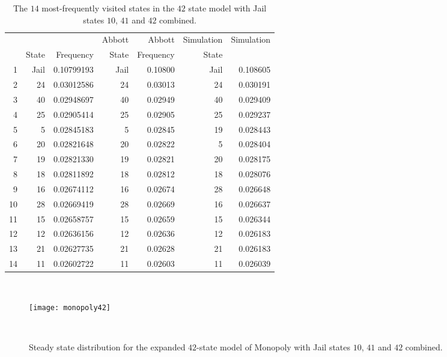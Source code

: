 \documentclass[12pt]{article}
\begin{document}
\begin{table}
    \centering
    \begin{tabular}{rrrrrrr}
           &       &            & Abbott & Abbott    & Simulation & Simulation \\ 
           & State & Frequency  & State  & Frequency & State      &            \\ 
        1  & Jail  & 0.10799193 & Jail   & 0.10800   & Jail       & 0.108605   \\ 
        2  & 24    & 0.03012586 & 24     & 0.03013   & 24         & 0.030191   \\ 
        3  & 40    & 0.02948697 & 40     & 0.02949   & 40         & 0.029409   \\ 
        4  & 25    & 0.02905414 & 25     & 0.02905   & 25         & 0.029237   \\ 
        5  & 5     & 0.02845183 & 5      & 0.02845   & 19         & 0.028443   \\ 
        6  & 20    & 0.02821648 & 20     & 0.02822   & 5          & 0.028404   \\ 
        7  & 19    & 0.02821330 & 19     & 0.02821   & 20         & 0.028175   \\ 
        8  & 18    & 0.02811892 & 18     & 0.02812   & 18         & 0.028076   \\ 
        9  & 16    & 0.02674112 & 16     & 0.02674   & 28         & 0.026648   \\ 
        10 & 28    & 0.02669419 & 28     & 0.02669   & 16         & 0.026637   \\ 
        11 & 15    & 0.02658757 & 15     & 0.02659   & 15         & 0.026344   \\ 
        12 & 12    & 0.02636156 & 12     & 0.02636   & 12         & 0.026183   \\ 
        13 & 21    & 0.02627735 & 21     & 0.02628   & 21         & 0.026183   \\ 
        14 & 11    & 0.02602722 & 11     & 0.02603   & 11         & 0.026039   \\ 
    \end{tabular}
    \caption{The \( 14 \) most-frequently visited states in the \( 42 \)
    state model with Jail states \( 10 \), \( 41 \) and \( 42 \)
    combined.}~%
    \label{tab:monopoly:freq42}
\end{table}

\begin{figure}
    \centering
    \texttt{[image: monopoly42]}
    \caption{Steady state distribution for the expanded \( 42 \)-state
    model of Monopoly with Jail states \( 10 \), \( 41 \) and \( 42 \)
    combined.}~%
    \label{fig:monopoly:monopoly42}
\end{figure}
\end{document}
